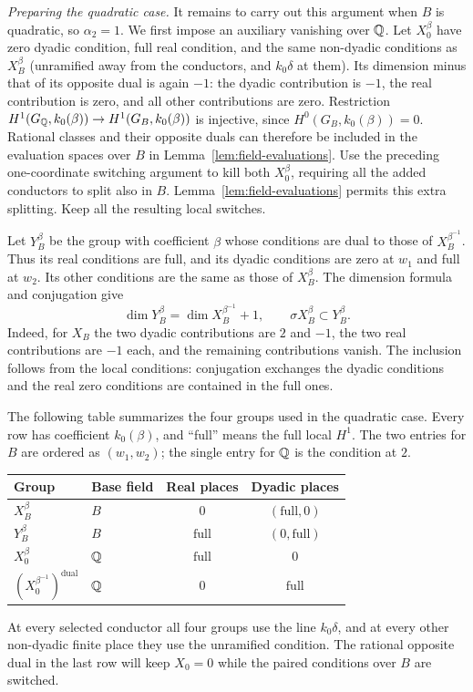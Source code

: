 \smallskip
\noindent\emph{Preparing the quadratic case.}
It remains to carry out this argument when $B$ is quadratic, so
$\alpha_2=1$.  We first impose an auxiliary vanishing over $\mathbb Q$.
Let $X_0^\beta$ have zero dyadic condition, full real condition, and
the same non-dyadic conditions as $X_B^\beta$ (unramified away from
the conductors, and $k_0\delta$ at them).  Its dimension minus that
of its opposite dual is again $-1$: the dyadic contribution is
$-1$, the real contribution is zero, and all other contributions
are zero.  Restriction
$H^1(G_{\mathbb Q},k_0(\beta))\to H^1(G_B,k_0(\beta))$ is injective,
since $H^0(G_B,k_0(\beta))=0$.  Rational classes and their opposite
duals can therefore be included in the evaluation spaces over $B$
in Lemma~\ref{lem:field-evaluations}.  Use the preceding
one-coordinate switching argument to
kill both $X_0^\beta$, requiring all the added conductors to split
also in $B$.  Lemma~\ref{lem:field-evaluations} permits this extra
splitting.  Keep all the resulting local switches.

Let $Y_B^\beta$ be the group with coefficient $\beta$ whose
conditions are dual to those of $X_B^{\beta^{-1}}$.  Thus its real
conditions are full, and its dyadic conditions are zero at $w_1$
and full at $w_2$.  Its other conditions are the same as those of
$X_B^\beta$.  The dimension formula and conjugation give
\begin{equation}\label{eq:b-selmer-comparison}
 \dim Y_B^\beta=\dim X_B^{\beta^{-1}}+1,
       \qquad \sigma X_B^\beta\subset Y_B^\beta.
\end{equation}
Indeed, for $X_B$ the two dyadic contributions are $2$ and $-1$,
the two real contributions are $-1$ each, and the remaining
contributions vanish.  The inclusion follows from the local
conditions: conjugation exchanges the dyadic conditions and the
real zero conditions are contained in the full ones.

The following table summarizes the four groups used in the quadratic
case. Every row has coefficient $k_0(\beta)$, and ``full'' means the
full local $H^1$. The two entries for $B$ are ordered as $(w_1,w_2)$;
the single entry for $\mathbb Q$ is the condition at $2$.
\begin{center}
\small
\begin{tabular}{@{}llcc@{}}
\toprule
Group & Base field & Real places & Dyadic places \\
\midrule
$X_B^\beta$ & $B$ & $0$ & $(\mathrm{full},0)$ \\
$Y_B^\beta$ & $B$ & $\mathrm{full}$ & $(0,\mathrm{full})$ \\
$X_0^\beta$ & $\mathbb Q$ & $\mathrm{full}$ & $0$ \\
$(X_0^{\beta^{-1}})^{\mathrm{dual}}$ & $\mathbb Q$ & $0$ & $\mathrm{full}$ \\
\bottomrule
\end{tabular}
\end{center}
At every selected conductor all four groups use the line $k_0\delta$,
and at every other non-dyadic finite place they use the unramified
condition. The rational
opposite dual in the last row will keep $X_0=0$ while the paired
conditions over $B$ are switched.

